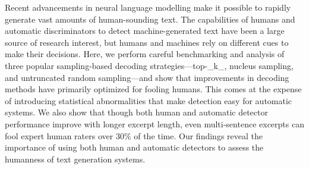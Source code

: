 Recent advancements in neural language modelling make it possible to rapidly generate vast amounts of human-sounding text. The capabilities of humans and automatic discriminators to detect machine-generated text have been a large source of research interest, but humans and machines rely on different cues to make their decisions. Here, we perform careful benchmarking and analysis of three popular sampling-based decoding strategies---top-\_k\_, nucleus sampling, and untruncated random sampling---and show that improvements in decoding methods have primarily optimized for fooling humans. This comes at the expense of introducing statistical abnormalities that make detection easy for automatic systems. We also show that though both human and automatic detector performance improve with longer excerpt length, even multi-sentence excerpts can fool expert human raters over 30\% of the time. Our findings reveal the importance of using both human and automatic detectors to assess the humanness of text generation systems.
